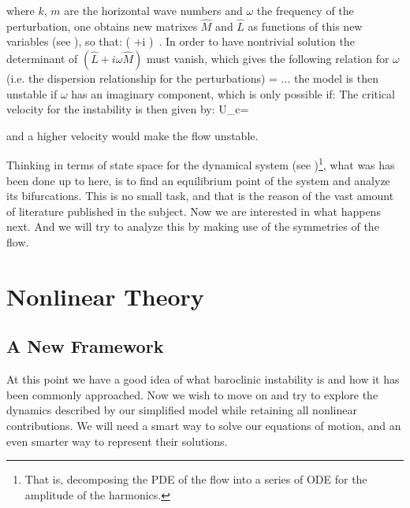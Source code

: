 where $k$, $m$ are the horizontal wave numbers and $\omega$ the frequency
of the perturbation, one obtains new matrixes $\hat{M}$ and $\hat{L}$ as
functions of this new variables (see ), so that:
\beq
\left( +i \omega {}\right) 
\,.
In order to have nontrivial solution the determinant of $\left( \hat{L}+i
\omega \hat{M}\right)$ must vanish, which gives the following relation
for $\omega$ (i.e. the dispersion relationship for the
perturbations)
\beq
\omega = ...%
the model is then unstable if $\omega$ has an imaginary component, which is only possible if:
\beq
The critical velocity for the instability is then given by:
\beq
U_c=%

and a higher velocity would make the flow unstable.

Thinking in terms of state space for the dynamical system (see
)\footnote{
    That is, decomposing the PDE of the flow into
    a series of ODE for the amplitude of the harmonics.
}, what was has been done up to here, is to find an equilibrium point of
the system and analyze its bifurcations. This is no small task, and that
is the reason of the vast amount of literature published in the subject.
Now we are interested in what happens next. And we will try to analyze
this by making use of the symmetries of the flow.

\section{Nonlinear Theory}
\label{s:nonlinear}
\subsection{A New Framework}
At this point we have a good idea of what baroclinic instability is and how it has been commonly approached. Now we wish to move on and try to explore the dynamics described by our simplified model while retaining all nonlinear contributions.
We will need a smart way to solve our equations of motion, and an even smarter way to represent their solutions.

